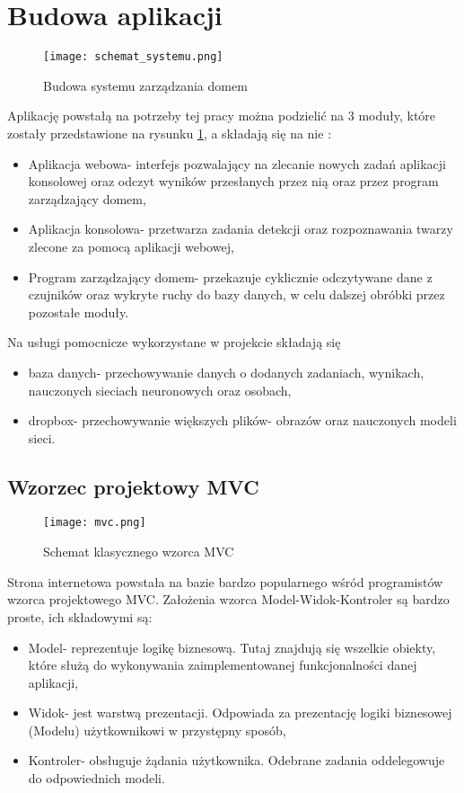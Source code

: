 \section{Budowa aplikacji}
\begin{figure}[H]
	\centering
	\texttt{[image: schemat\_systemu.png]}
	\caption{Budowa systemu zarządzania domem}
	\label{fig:schemat_systemu}
\end{figure}
Aplikację powstałą na potrzeby tej pracy można podzielić na 3 moduły, które zostały przedstawione na rysunku \ref{fig:schemat_systemu}, a składają się na nie :
\begin{itemize}
\item Aplikacja webowa- interfejs pozwalający na zlecanie nowych zadań aplikacji konsolowej oraz odczyt wyników przesłanych przez nią oraz przez program zarządzający domem,
\item Aplikacja konsolowa- przetwarza zadania detekcji oraz rozpoznawania twarzy zlecone za pomocą aplikacji webowej,
\item Program zarządzający domem- przekazuje cyklicznie odczytywane dane z czujników oraz wykryte ruchy do bazy danych, w celu dalszej obróbki przez pozostałe moduły.
\end{itemize}
Na usługi pomocnicze wykorzystane w projekcie składają się
\begin{itemize}
\item baza danych- przechowywanie danych o dodanych zadaniach, wynikach, nauczonych sieciach neuronowych oraz osobach,
\item dropbox- przechowywanie większych plików- obrazów oraz nauczonych modeli sieci.
\end{itemize}

\subsection{Wzorzec projektowy MVC}
\begin{figure}[H]
	\centering
	\texttt{[image: mvc.png]}
	\caption{Schemat klasycznego wzorca MVC}
	\label{fig:schemat_mvc}
\end{figure}
Strona internetowa powstała na bazie bardzo popularnego wśród programistów wzorca projektowego MVC. Założenia wzorca Model-Widok-Kontroler są bardzo proste, ich składowymi są:
\begin{itemize}
\item Model- reprezentuje logikę biznesową. Tutaj znajdują się wszelkie obiekty, które służą do wykonywania zaimplementowanej funkcjonalności danej aplikacji,
\item Widok- jest warstwą prezentacji. Odpowiada za prezentację logiki biznesowej (Modelu) użytkownikowi w przystępny sposób,
\item Kontroler- obsługuje żądania użytkownika. Odebrane zadania oddelegowuje do odpowiednich modeli.
\end{itemize}

